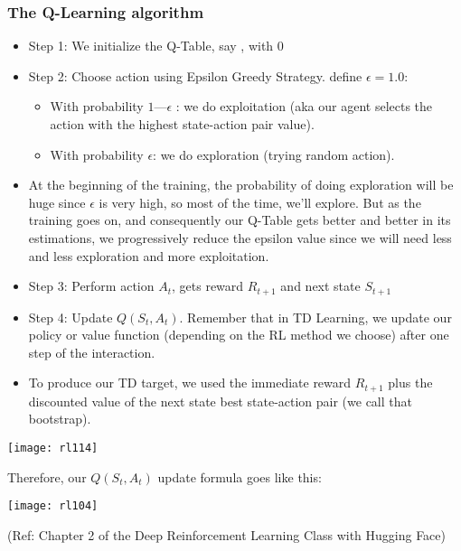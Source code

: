 \begin{frame}[fragile]\frametitle{The Q-Learning algorithm}

\begin{itemize}
\item Step 1: We initialize the Q-Table, say , with 0
\item Step 2: Choose action using Epsilon Greedy Strategy.  define $\epsilon = 1.0$:
\begin{itemize}
\item With probability $1 — \epsilon$ : we do exploitation (aka our agent selects the action with the highest state-action pair value).
\item With probability $\epsilon$: we do exploration (trying random action). 
\end{itemize}
\item At the beginning of the training, the probability of doing exploration will be huge since $\epsilon$ is very high, so most of the time, we'll explore. But as the training goes on, and consequently our Q-Table gets better and better in its estimations, we progressively reduce the epsilon value since we will need less and less exploration and more exploitation.
\item Step 3: Perform action $A_t$, gets reward $R_{t+1}$ and next state $S_{t+1}$
\item Step 4: Update $Q(S_t, A_t)$. Remember that in TD Learning, we update our policy or value function (depending on the RL method we choose) after one step of the interaction.
\item To produce our TD target, we used the immediate reward $R_{t+1}$ plus the discounted value of the next state best state-action pair (we call that bootstrap).

\end{itemize}


\begin{center}
\texttt{[image: rl114]}
\end{center}

Therefore, our $Q(S_t, A_t)$ update formula goes like this:

\begin{center}
\texttt{[image: rl104]}
\end{center}

 
{\tiny (Ref: Chapter 2 of the Deep Reinforcement Learning Class with Hugging Face)}

\end{frame}

